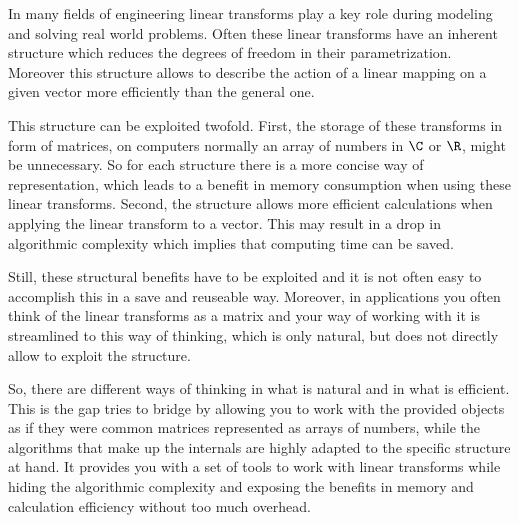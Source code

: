 %
%
%  
%
%
%
%

In many fields of engineering linear transforms play a key role during modeling
and solving real world problems. Often these linear transforms have an inherent
structure which reduces the degrees of freedom in their parametrization.
Moreover this structure allows to describe the action of a linear mapping on a
given vector more efficiently than the general one.

This structure can be exploited twofold. First, the storage of these transforms
in form of matrices, on computers normally an array of numbers in 
$\C$ or $\R$, might be unnecessary.
So for each structure there is a more concise way of representation, which leads
to a benefit in memory consumption when using these linear transforms. Second,
the structure allows more efficient calculations when applying the linear
transform to a vector. This may result in a drop in algorithmic complexity which
implies that computing time can be saved.

Still, these structural benefits have to be exploited and it is not often easy
to accomplish this in a save and reuseable way. Moreover, in applications you
often think of the linear transforms as a matrix and your way of working with
it is streamlined to this way of thinking, which is only natural, but does not
directly allow to exploit the structure.

So, there are different ways of thinking in what is natural and in what is
efficient. This is the gap \fm{} tries to bridge by allowing you to work with
the provided objects as if they were common matrices represented as arrays of
numbers, while the algorithms that make up the internals are highly adapted to
the specific structure at hand. It provides you with a set of tools to work with
linear transforms while hiding the algorithmic complexity and exposing the
benefits in memory and calculation efficiency without too much overhead.

